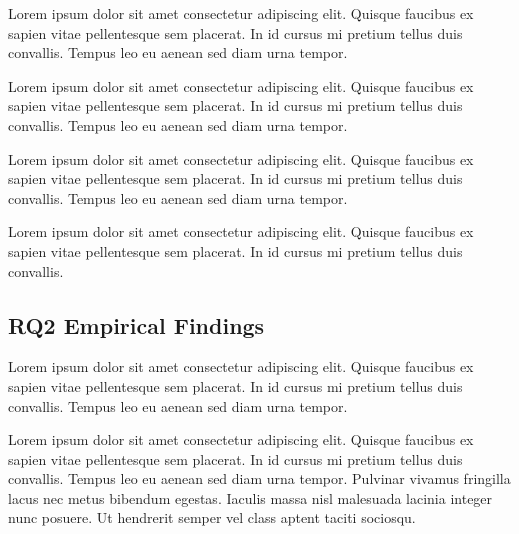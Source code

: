 \documentclass[sigconf,nonacm]{acmart} %
\begin{document}
Lorem ipsum dolor sit amet consectetur adipiscing elit.
Quisque faucibus ex sapien vitae pellentesque sem placerat. 
In id cursus mi pretium tellus duis convallis. 
Tempus leo eu aenean sed diam urna tempor.

Lorem ipsum dolor sit amet consectetur adipiscing elit.
Quisque faucibus ex sapien vitae pellentesque sem placerat. 
In id cursus mi pretium tellus duis convallis. 
Tempus leo eu aenean sed diam urna tempor.

Lorem ipsum dolor sit amet consectetur adipiscing elit.
Quisque faucibus ex sapien vitae pellentesque sem placerat. 
In id cursus mi pretium tellus duis convallis. 
Tempus leo eu aenean sed diam urna tempor.

Lorem ipsum dolor sit amet consectetur adipiscing elit.
Quisque faucibus ex sapien vitae pellentesque sem placerat. 
In id cursus mi pretium tellus duis convallis. 

\subsection{RQ2 Empirical Findings}
\label{subsec:rq2_findings}

Lorem ipsum dolor sit amet consectetur adipiscing elit.
Quisque faucibus ex sapien vitae pellentesque sem placerat. 
In id cursus mi pretium tellus duis convallis. 
Tempus leo eu aenean sed diam urna tempor.

Lorem ipsum dolor sit amet consectetur adipiscing elit. 
Quisque faucibus ex sapien vitae pellentesque sem placerat.
In id cursus mi pretium tellus duis convallis. 
Tempus leo eu aenean sed diam urna tempor.
Pulvinar vivamus fringilla lacus nec metus bibendum egestas. 
Iaculis massa nisl malesuada lacinia integer nunc posuere.
Ut hendrerit semper vel class aptent taciti sociosqu. 
\end{document}
